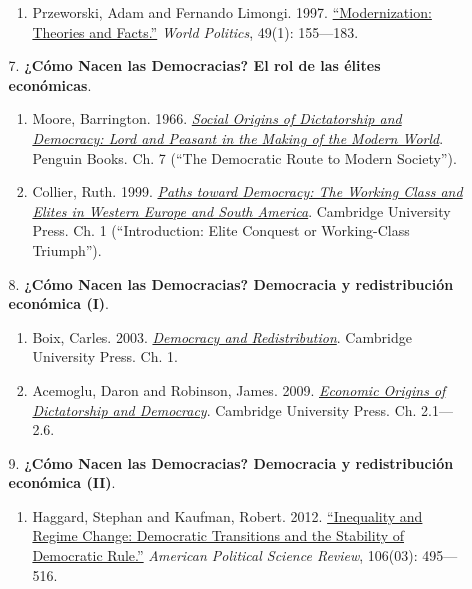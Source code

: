 \documentclass[letterpaper]{article}
\begin{document}
\begin{enumerate}
\begin{enumerate}
\begin{enumerate}
						\item Przeworski, Adam and Fernando Limongi. 1997. \href{https://github.com/hbahamonde/Ciencia_Politica_I/raw/master/Readings/Przeworski_Limongi_1997.pdf}{``Modernization: Theories and Facts.''} \emph{World Politics}, 49(1): 155---183.
          \end{enumerate}
				
				

				\item[7.] {\bf ¿C\'omo Nacen las Democracias? El rol de las \'elites econ\'omicas}. 
					\begin{enumerate}
						\item Moore, Barrington. 1966. \href{https://github.com/hbahamonde/Ciencia_Politica_I/raw/master/Readings/Moore.pdf}{\emph{Social Origins of Dictatorship and Democracy: Lord and Peasant in the Making of the Modern World}}. Penguin Books. Ch. 7 (``The Democratic Route to Modern Society'').
						
						\item Collier, Ruth. 1999. \href{https://github.com/hbahamonde/Ciencia_Politica_I/raw/master/Readings/Collier.pdf}{\emph{Paths toward Democracy: The Working Class and Elites in Western Europe and South America}}. Cambridge University Press. Ch. 1 (``Introduction: Elite Conquest or Working-Class Triumph'').
					\end{enumerate}

				\item[8.] {\bf ¿C\'omo Nacen las Democracias? Democracia y redistribuci\'on econ\'omica (I)}.  
					\begin{enumerate}
						\item Boix, Carles. 2003. \href{https://github.com/hbahamonde/Ciencia_Politica_I/raw/master/Readings/Boix_2003.pdf}{\emph{Democracy and Redistribution}}. Cambridge University Press. Ch. 1.

						\item Acemoglu, Daron and Robinson, James. 2009. \href{https://github.com/hbahamonde/Ciencia_Politica_I/raw/master/Readings/Acemoglu_Robinson.pdf}{\emph{Economic Origins of Dictatorship and Democracy}}. Cambridge University Press. Ch. 2.1---2.6.
					\end{enumerate}


				\item[9.] {\bf ¿C\'omo Nacen las Democracias? Democracia y redistribuci\'on econ\'omica (II)}.  
					\begin{enumerate}
						\item Haggard, Stephan and Kaufman, Robert. 2012. \href{https://github.com/hbahamonde/Ciencia_Politica_I/raw/master/Readings/Haggard_Kaufman.pdf}{``Inequality and Regime Change: Democratic Transitions and the Stability of Democratic Rule.''} \emph{American Political Science Review}, 106(03): 495---516.


\end{enumerate}
\end{enumerate}
\end{enumerate}
\end{document}
